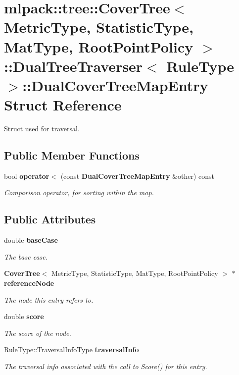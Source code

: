 \section{mlpack\+:\+:tree\+:\+:Cover\+Tree$<$ Metric\+Type, Statistic\+Type, Mat\+Type, Root\+Point\+Policy $>$\+:\+:Dual\+Tree\+Traverser$<$ Rule\+Type $>$\+:\+:Dual\+Cover\+Tree\+Map\+Entry Struct Reference}
\label{structmlpack_1_1tree_1_1CoverTree_1_1DualTreeTraverser_1_1DualCoverTreeMapEntry}


Struct used for traversal.  


\subsection*{Public Member Functions}
\begin{DoxyCompactItemize}
\item 
bool {\bf operator$<$} (const {\bf Dual\+Cover\+Tree\+Map\+Entry} \&other) const 
\begin{DoxyCompactList}\small\item\em Comparison operator, for sorting within the map. \end{DoxyCompactList}\end{DoxyCompactItemize}
\subsection*{Public Attributes}
\begin{DoxyCompactItemize}
\item 
double {\bf base\+Case}
\begin{DoxyCompactList}\small\item\em The base case. \end{DoxyCompactList}\item 
{\bf Cover\+Tree}$<$ Metric\+Type, Statistic\+Type, Mat\+Type, Root\+Point\+Policy $>$ $\ast$ {\bf reference\+Node}
\begin{DoxyCompactList}\small\item\em The node this entry refers to. \end{DoxyCompactList}\item 
double {\bf score}
\begin{DoxyCompactList}\small\item\em The score of the node. \end{DoxyCompactList}\item 
Rule\+Type\+::\+Traversal\+Info\+Type {\bf traversal\+Info}
\begin{DoxyCompactList}\small\item\em The traversal info associated with the call to Score() for this entry. \end{DoxyCompactList}\end{DoxyCompactItemize}


